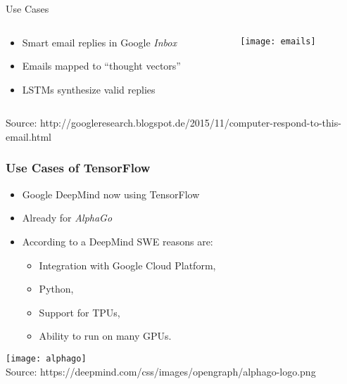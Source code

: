 \begin{slide}{Use Cases}
\begin{columns}
  \begin{column}{0.6\textwidth}
    \begin{itemize}
      \item Smart email replies in Google \emph{Inbox}
      \item Emails mapped to ``thought vectors''
      \item LSTMs synthesize valid replies
    \end{itemize}
  \end{column}
  \begin{column}{0.4\textwidth}
    \begin{figure}
      \texttt{[image: emails]}
    \end{figure}
  \end{column}
\end{columns}
{\tiny Source: http://googleresearch.blogspot.de/2015/11/computer-respond-to-this-email.html}
\end{slide}

\begin{frame}
  \frametitle{Use Cases of TensorFlow}
  \begin{itemize}
  \item Google DeepMind now using TensorFlow
  \item Already for \emph{AlphaGo}
  \item According to a DeepMind SWE reasons are:

    \begin{itemize}
    \item Integration with Google Cloud Platform,
    \item Python,
    \item Support for TPUs,
    \item Ability to run on many GPUs.
    \end{itemize}
  \end{itemize}
  \begin{center}
    \texttt{[image: alphago]}\\
    \vspace{0.1cm}
    \tiny Source:
      https://deepmind.com/css/images/opengraph/alphago-logo.png
  \end{center}
\end{frame}

